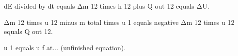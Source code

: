 dE divided by dt equals Δm 12 times h 12 plus Q out 12 equals ΔU.  

Δm 12 times u 12 minus m total times u 1 equals negative Δm 12 times u 12 equals Q out 12.  

u 1 equals u f at... (unfinished equation).